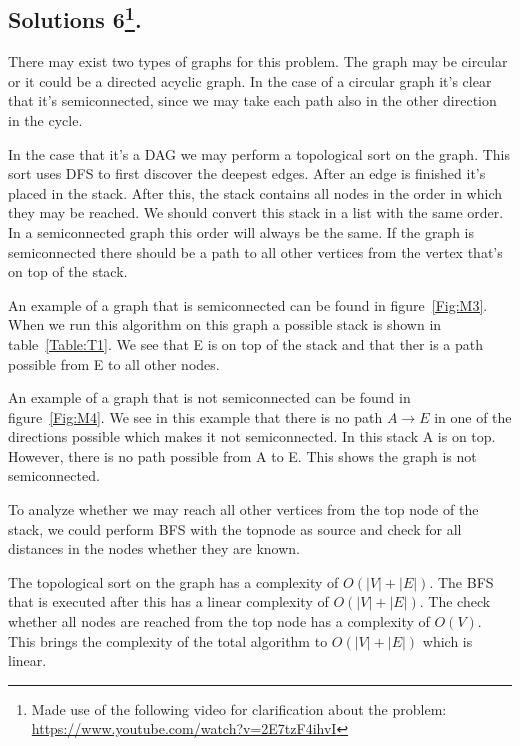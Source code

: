 \documentclass{article}
\begin{document}
\subsection*{Solutions 6\footnote{Made use of the following video for clarification about the problem: \href{https://www.youtube.com/watch?v=2E7tzF4ihvI}{https://www.youtube.com/watch?v=2E7tzF4ihvI}}.}
There may exist two types of graphs for this problem. The graph may be circular or it could be a directed acyclic graph. In the case of a circular graph it's clear that it's semiconnected, since we may take each path also in the other direction in the cycle.

In the case that it's a DAG we may perform a topological sort on the graph. This sort uses DFS to first discover the deepest edges. After an edge is finished it's placed in the stack. After this, the stack contains all nodes in the order in which they may be reached. We should convert this stack in a list with the same order. In a semiconnected graph this order will always be the same. If the graph is semiconnected there should be a path to all other vertices from the vertex that's on top of the stack.

An example of a graph that is semiconnected can be found in figure~\ref{Fig:M3}. When we run this algorithm on this graph a possible stack is shown in table~\ref{Table:T1}. We see that E is on top of the stack and that ther is a path possible from E to all other nodes.

An example of a graph that is not semiconnected can be found in figure~\ref{Fig:M4}. We see in this example that there is no path $A \to E$ in one of the directions possible which makes it not semiconnected. In this stack A is on top. However, there is no path possible from A to E. This shows the graph is not semiconnected.

To analyze whether we may reach all other vertices from the top node of the stack, we could perform BFS with the topnode as source and check for all distances in the nodes whether they are known.

The topological sort on the graph has a complexity of $O(|V| + |E|)$. The BFS that is executed after this has a linear complexity of $O(|V| + |E|)$. The check whether all nodes are reached from the top node has a complexity of $O(V)$. This brings the complexity of the total algorithm to $O(|V| + |E|)$ which is linear.
\end{document}

